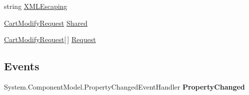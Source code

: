 \begin{DoxyCompactItemize}
\begin{DoxyCompactList}\small\item\em \end{DoxyCompactList}\item 
\hypertarget{class_price___comparison_1_1amazon_1_1ecs_1_1_cart_modify_a06f2ab4e77ef95b6e0c98420986fbcf5}{string \hyperlink{class_price___comparison_1_1amazon_1_1ecs_1_1_cart_modify_a06f2ab4e77ef95b6e0c98420986fbcf5}{X\-M\-L\-Escaping}}\label{class_price___comparison_1_1amazon_1_1ecs_1_1_cart_modify_a06f2ab4e77ef95b6e0c98420986fbcf5}

\begin{DoxyCompactList}\small\item\em \end{DoxyCompactList}\item 
\hypertarget{class_price___comparison_1_1amazon_1_1ecs_1_1_cart_modify_aeacbb70512560a49599472c91e6ce045}{\hyperlink{class_price___comparison_1_1amazon_1_1ecs_1_1_cart_modify_request}{Cart\-Modify\-Request} \hyperlink{class_price___comparison_1_1amazon_1_1ecs_1_1_cart_modify_aeacbb70512560a49599472c91e6ce045}{Shared}}\label{class_price___comparison_1_1amazon_1_1ecs_1_1_cart_modify_aeacbb70512560a49599472c91e6ce045}

\begin{DoxyCompactList}\small\item\em \end{DoxyCompactList}\item 
\hypertarget{class_price___comparison_1_1amazon_1_1ecs_1_1_cart_modify_ab619c36e7b507e6d58639931dc8f8bad}{\hyperlink{class_price___comparison_1_1amazon_1_1ecs_1_1_cart_modify_request}{Cart\-Modify\-Request}\mbox{[}$\,$\mbox{]} \hyperlink{class_price___comparison_1_1amazon_1_1ecs_1_1_cart_modify_ab619c36e7b507e6d58639931dc8f8bad}{Request}}\label{class_price___comparison_1_1amazon_1_1ecs_1_1_cart_modify_ab619c36e7b507e6d58639931dc8f8bad}

\begin{DoxyCompactList}\small\item\em \end{DoxyCompactList}\end{DoxyCompactItemize}
\subsection*{Events}
\begin{DoxyCompactItemize}
\item 
\hypertarget{class_price___comparison_1_1amazon_1_1ecs_1_1_cart_modify_a4a4c5faf4e41790958b49434dbb4aa6d}{System.\-Component\-Model.\-Property\-Changed\-Event\-Handler {\bfseries Property\-Changed}}\label{class_price___comparison_1_1amazon_1_1ecs_1_1_cart_modify_a4a4c5faf4e41790958b49434dbb4aa6d}

\end{DoxyCompactItemize}
